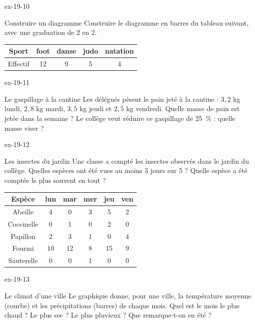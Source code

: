 \begin{blocLivre}{ex-19-10}\begin{exercice}[2]{Construire un diagramme}
Construire le diagramme en barres du tableau suivant, avec une graduation de 2 en 2.\begin{center}\renewcommand{\arraystretch}{1.35}\begin{tabular}{c|cccc}\toprule
Sport & foot & danse & judo & natation\\\midrule
Effectif & 12 & 9 & 5 & 4\\
\bottomrule\end{tabular}\end{center}
\label{fig-ex-19-10}
\end{exercice}\end{blocLivre}

\begin{blocLivre}{ex-19-11}\begin{exercice}[3]{Le gaspillage à la cantine}
Les délégués pèsent le pain jeté à la cantine : $3{,}2$ kg lundi, $2{,}8$ kg mardi, $3{,}5$ kg jeudi et $2{,}5$ kg vendredi. Quelle masse de pain est jetée dans la semaine ? Le collège veut réduire ce gaspillage de 25~\% : quelle masse viser ?
\end{exercice}\end{blocLivre}
\begin{blocLivre}{ex-19-12}\begin{exercice}[3]{Les insectes du jardin}
Une classe a compté les insectes observés dans le jardin du collège. Quelles espèces ont été vues au moins 3 jours sur 5 ? Quelle espèce a été comptée le plus souvent en tout ?\begin{center}\renewcommand{\arraystretch}{1.35}\begin{tabular}{c|ccccc}\toprule
Espèce & lun & mar & mer & jeu & ven\\\midrule
Abeille & 4 & 0 & 3 & 5 & 2\\
Coccinelle & 0 & 1 & 0 & 2 & 0\\
Papillon & 2 & 3 & 1 & 0 & 4\\
Fourmi & 10 & 12 & 8 & 15 & 9\\
Sauterelle & 0 & 0 & 1 & 0 & 0\\
\bottomrule\end{tabular}\end{center}
\end{exercice}\end{blocLivre}
\begin{blocLivre}{ex-19-13}\begin{exercice}[3]{Le climat d’une ville}
Le graphique donne, pour une ville, la température moyenne (courbe) et les précipitations (barres) de chaque mois. Quel est le mois le plus chaud ? Le plus sec ? Le plus pluvieux ? Que remarque-t-on en été ?
\label{fig-ex-19-13}
\end{exercice}\end{blocLivre}
